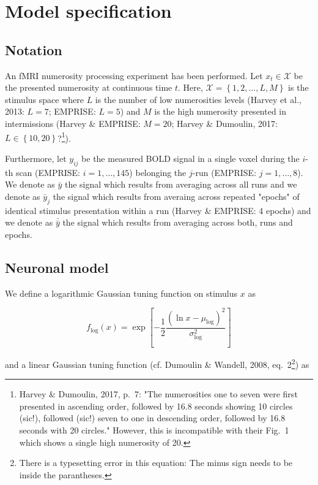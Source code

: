 \documentclass[a4paper,12pt]{article}
\begin{document}
\section{Model specification} \label{sec:Mod}

\subsection{Notation}

An fMRI numerosity processing experiment has been performed. Let $x_t \in \mathcal{X}$ be the presented numerosity at continuous time $t$. Here, $\mathcal{X} = \left\lbrace 1, 2, \ldots, L, M \right\rbrace$ is the stimulus space where $L$ is the number of low numerosities levels (Harvey et al., 2013: $L = 7$; EMPRISE: $L = 5$) and $M$ is the high numerosity presented in intermissions (Harvey \& EMPRISE: $M = 20$; Harvey \& Dumoulin, 2017: $L \in \left\lbrace 10, 20 \right\rbrace$?\footnote{Harvey \& Dumoulin, 2017, p.~7: "The numerosities one to seven were first presented in ascending order, followed by 16.8 seconds showing 10 circles (sic!), followed (sic!) seven to one in descending order, followed by 16.8 seconds with 20 circles." However, this is incompatible with their Fig.~1 which shows a single high numerosity of 20.}).

Furthermore, let $y_{ij}$ be the measured BOLD signal in a single voxel during the $i$-th scan (EMPRISE: $i = 1,\ldots,145$) belonging the $j$-run (EMPRISE: $j = 1,\ldots,8$). We denote as $\bar{y}$ the signal which results from averaging across all runs and we denote as $\bar{y}_j$ the signal which results from averaing across repeated "epochs" of identical stimulus presentation within a run (Harvey \& EMPRISE: 4 epochs) and we denote as $\bar{\bar{y}}$  the signal which results from averaging across both, runs and epochs.


\subsection{Neuronal model}

We define a logarithmic Gaussian tuning function on stimulus $x$ as

\begin{equation} \label{eq:f-log}
f_\mathrm{log}(x) = \exp \left[ -\frac{1}{2} \frac{(\ln x - \mu_\mathrm{log})^2}{\sigma_\mathrm{log}^2} \right]
\end{equation}

\pagebreak
and a linear Gaussian tuning function (cf. Dumoulin \& Wandell, 2008, eq.~2\footnote{There is a typesetting error in this equation: The minus sign needs to be inside the parantheses.}) as 
\end{document}
